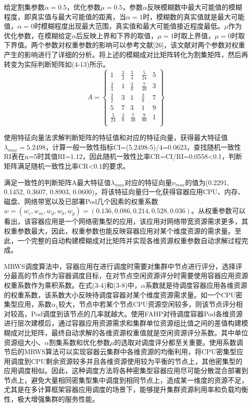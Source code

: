 给定割集参数$\alpha=0.5$，优化参数$\mu=0.5$，参数$\alpha$反映模糊数中最大可能值的模糊程度，即真实值与最大可能值的距离，当$\alpha=1$时，模糊数的真实值就是最大可能值，$\alpha=0$时模糊程度出现最大范围，真实值和最大可能值接近程度最低。$\mu$作为优化参数，在模糊给定$\alpha$后反映上界和下界的取值，$\mu=1$时取上界值，$\mu=0$时取下界值。两个参数对权重参数的影响可以参考文献[26]，该文献对两个参数对权重产生的影响进行了详细的分析。将上述的模糊成对比矩阵转化为割集矩阵，然后再转变为实际判断矩阵如(4-13)所示。
\begin{equation}
A = \left\{\begin{array}{ccccc}
1 & \frac{3}{2} & \frac{3}{4} & \frac{5}{24} & 5 \\
\frac{3}{4} & 1 & \frac{3}{8} & \frac{7}{48} & 3 \\
\frac{3}{2} & 3 & 1 & \frac{3}{8} & 7 \\
5 & 7 & 3 & 1 & 9 \\
\frac{5}{24} & \frac{3}{8} & \frac{7}{48} & \frac{9}{80} & 1 \\
\end{array}\right\}
\end{equation}

使用特征向量法求解判断矩阵的特征值和对应的特征向量，获得最大特征值$\lambda_{max}=5.2498$，计算一般一致性指标CI=(5.2498-5)/4=0.0623，查找随机一致性RI表在n=5时其值RI=1.12，因此随机一致性比率CR=CI/RI=0.0558<0.1，判断矩阵满足随机一致性比率CR<0.1的要求。

满足一致性的判断矩阵A最大特征值$\lambda_{max}$对应的特征向量$\nu_{max}$的值为(0.2291, 0.1452, 0.3607, 0.8903, 0.0600)，将该特征向量归一化获得容器应用CPU、内存、磁盘、网络带宽以及已部署Pod几个因素的权重系数$w=(w_{c}, w_{m}, w_{d}, w_{b}, w_{p})=(0.136, 0.086, 0.214, 0.528, 0.036)$。从权重参数可以看出，该容器应用是一个网络密集型的应用，该应用对网络带宽资源需求更多，其权重参数最大，因此，权重参数也能反映容器应用对某个维度资源的需求量。至此，一个完整的自动构建模糊成对比矩阵并实现各维资源权重参数自动求解过程完成。

MRWS调度算法中，容器应用在进行调度时需要对集群中节点进行评分，选择评分最高的节点作为容器调度目标，在对节点空闲资源评分时需要使用容器应用资源权重系数作为乘积系数。在式(3-4)和(3-8)中，$\alpha$系数就是待调度容器应用各维资源的权重系数，该系数大小反映待调度容器对某个维度资源需求量。如一个CPU密集型应用，系数$\alpha_{1}$较大，节点中若某个节点CPU资源空闲较多，则该节点评分相对较高，Pod调度到该节点的几率就越大。使用FAHP对待调度容器Pod各维资源进行层次建模后，通过容器应用资源需求和集群单位资源组比值之间的差值构建模糊成对比矩阵，最终自动求解的各维资源权重值就是空闲资源评分系数。其中单位资源组大小、$\alpha$割集系数和优化参数$\mu$的选取对调度评分都至关重要。使用系数调节后的MRWS算法可以实现容器云集群中各维资源的均衡利用，将CPU密集型应用调度到CPU剩余资源较多并且各维资源使用较为平衡的节点上，其他密集型的应用调度相似。因此，这种调度方法将各种密集型容器应用尽可能分散混合部署到节点上，避免大量相同密集型集中调度到相同节点上，造成某一维度的资源不足，尤其是在多计算框架容器应用调度的场景下，能够提升集群资源利用率和负载均衡性，极大增强集群的服务性能。

